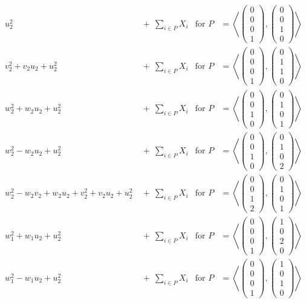 \documentclass[landscape]{amsart}
\newcommand{\vect}[1]{\left( \begin{smallmatrix} #1 \end{smallmatrix} \right)}
\newcommand{\plan}[2]{\left< \vect{ #1 }, \vect{ #2 } \right>}
\theoremstyle{plain}
\theoremstyle{definition}
\theoremstyle{remark}
\begin{document}
\begin{align}\label{initial}
u_2^2& \ + \ \sum_{i\in P} X_i & \text{for } P &= \plan{0\\0\\0\\1}{0\\0\\1\\0}\\
v_2^2+v_2u_2+u_2^2& \ + \ \sum_{i\in P} X_i & \text{for } P &= \plan{0\\0\\0\\1}{0\\1\\1\\0}\\
w_2^2+w_2u_2+u_2^2& \ + \ \sum_{i\in P} X_i & \text{for } P &= \plan{0\\0\\1\\0}{0\\1\\0\\1}\\
w_2^2-w_2u_2+u_2^2& \ + \ \sum_{i\in P} X_i & \text{for } P &= \plan{0\\0\\1\\0}{0\\1\\0\\2}\\
w_2^2-w_2v_2+w_2u_2+v_2^2+v_2u_2+u_2^2& \ + \ \sum_{i\in P} X_i & \text{for } P &= \plan{0\\0\\1\\2}{0\\1\\0\\1}\\
w_1^2+w_1u_2+u_2^2& \ + \ \sum_{i\in P} X_i & \text{for } P &= \plan{0\\0\\0\\1}{1\\0\\2\\0}\\
w_1^2-w_1u_2+u_2^2& \ + \ \sum_{i\in P} X_i & \text{for } P &= \plan{0\\0\\0\\1}{1\\0\\1\\0}\\

\end{align}
\end{document}
